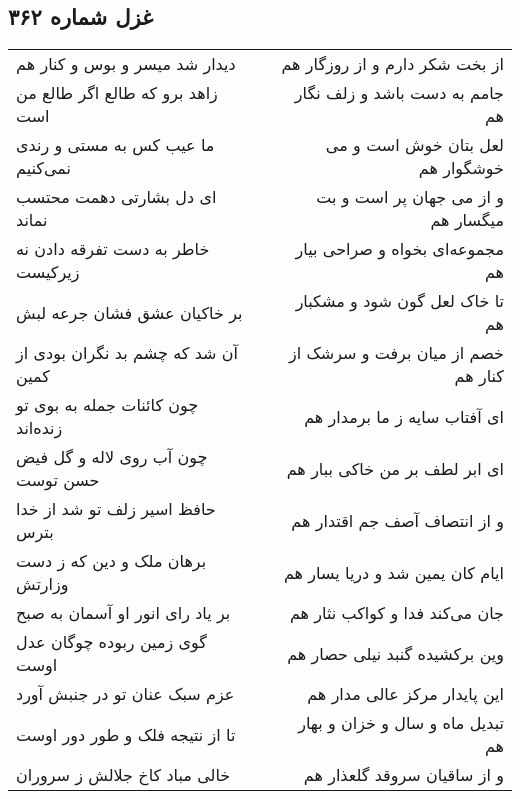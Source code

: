 \begin{center}
\section*{غزل شماره ۳۶۲}
\label{sec:sh362}
\begin{longtable}{l p{0.5cm} r}
دیدار شد میسر و بوس و کنار هم
&&
از بخت شکر دارم و از روزگار هم
\\
زاهد برو که طالع اگر طالع من است
&&
جامم به دست باشد و زلف نگار هم
\\
ما عیب کس به مستی و رندی نمی‌کنیم
&&
لعل بتان خوش است و می خوشگوار هم
\\
ای دل بشارتی دهمت محتسب نماند
&&
و از می جهان پر است و بت میگسار هم
\\
خاطر به دست تفرقه دادن نه زیرکیست
&&
مجموعه‌ای بخواه و صراحی بیار هم
\\
بر خاکیان عشق فشان جرعه لبش
&&
تا خاک لعل گون شود و مشکبار هم
\\
آن شد که چشم بد نگران بودی از کمین
&&
خصم از میان برفت و سرشک از کنار هم
\\
چون کائنات جمله به بوی تو زنده‌اند
&&
ای آفتاب سایه ز ما برمدار هم
\\
چون آب روی لاله و گل فیض حسن توست
&&
ای ابر لطف بر من خاکی ببار هم
\\
حافظ اسیر زلف تو شد از خدا بترس
&&
و از انتصاف آصف جم اقتدار هم
\\
برهان ملک و دین که ز دست وزارتش
&&
ایام کان یمین شد و دریا یسار هم
\\
بر یاد رای انور او آسمان به صبح
&&
جان می‌کند فدا و کواکب نثار هم
\\
گوی زمین ربوده چوگان عدل اوست
&&
وین برکشیده گنبد نیلی حصار هم
\\
عزم سبک عنان تو در جنبش آورد
&&
این پایدار مرکز عالی مدار هم
\\
تا از نتیجه فلک و طور دور اوست
&&
تبدیل ماه و سال و خزان و بهار هم
\\
خالی مباد کاخ جلالش ز سروران
&&
و از ساقیان سروقد گلعذار هم
\\
\end{longtable}
\end{center}
